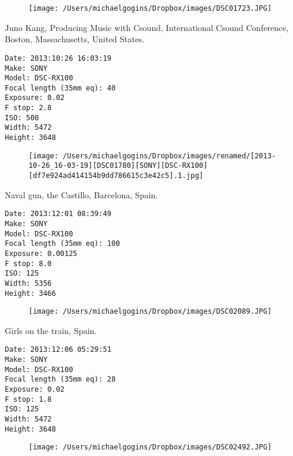 \documentclass[11pt,letter,DIV=14,paper=landscape]{scrbook}
\begin{document}
\begin{figure}
\texttt{[image: /Users/michaelgogins/Dropbox/images/DSC01723.JPG]}
\end{figure}
    
\clearpage
\noindent Juno Kang, Producing Music with Csound, International Csound Conference, Boston, Massachusetts, United States.
\noindent
\begin{lstlisting}
Date: 2013:10:26 16:03:19
Make: SONY
Model: DSC-RX100
Focal length (35mm eq): 40
Exposure: 0.02
F stop: 2.8
ISO: 500
Width: 5472
Height: 3648
\end{lstlisting}
\clearpage

\begin{figure}
\texttt{[image: /Users/michaelgogins/Dropbox/images/renamed/[2013-10-26\_16-03-19][DSC01780][SONY][DSC-RX100][df7e924ad414154b9dd786615c3e42c5].1.jpg]}
\end{figure}
    
\clearpage
\noindent Naval gun, the Castillo, Barcelona, Spain.
\noindent
\begin{lstlisting}
Date: 2013:12:01 08:39:49
Make: SONY
Model: DSC-RX100
Focal length (35mm eq): 100
Exposure: 0.00125
F stop: 8.0
ISO: 125
Width: 5356
Height: 3466
\end{lstlisting}
\clearpage

\begin{figure}
\texttt{[image: /Users/michaelgogins/Dropbox/images/DSC02089.JPG]}
\end{figure}
    
\clearpage
\noindent Girls on the train, Spain.
\noindent
\begin{lstlisting}
Date: 2013:12:06 05:29:51
Make: SONY
Model: DSC-RX100
Focal length (35mm eq): 28
Exposure: 0.02
F stop: 1.8
ISO: 125
Width: 5472
Height: 3648
\end{lstlisting}
\clearpage

\begin{figure}
\texttt{[image: /Users/michaelgogins/Dropbox/images/DSC02492.JPG]}
\end{figure}
    
\end{document}
